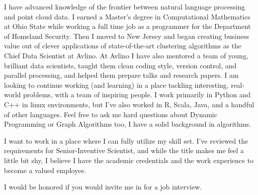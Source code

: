 \documentclass[11pt, a4paper]{awesome-cv}
\begin{document}
\makecvheader

\makelettertitle

\begin{cvletter}
I have advanced knowledge of the frontier between natural language processing and point cloud data. I earned a Master's degree in Computational Mathematics at Ohio State while working a full time job as a programmer for the Department of Homeland Security. Then I moved to New Jersey and began creating business value out of clever applications of state-of-the-art clustering algorithms as the Chief Data Scientist at Avlino. At Avlino I have also mentored a team of young, brilliant data scientists, taught them clean coding style, version control, and parallel processing, and helped them prepare talks and research papers. I am looking to continue working (and learning) in a place tackling interesting, real-world problems, with a team of inspiring people. I work primarily in Python and C++ in linux environments, but I've also worked in R, Scala, Java, and a handful of other languages. Feel free to ask me hard questions about Dynamic Programming or Graph Algorithms too, I have a solid background in algorithms.


I want to work in a place where I can fully utilize my skill set. I've reviewed the requirements for Senior-Inventive Scientist, and while the title makes me feel a little bit shy, I believe I have the academic credentials and the work experience to become a valued employee.

I would be honored if you would invite me in for a job interview. 
\end{cvletter}

\makeletterclosing
\end{document}
